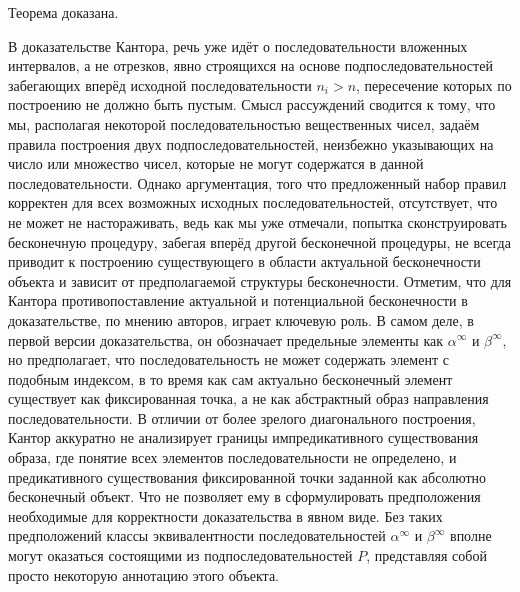 \documentclass[12pt]{article}
\begin{document}
Теорема доказана.

В доказательстве Кантора, речь уже идёт о последовательности вложенных интервалов, а не отрезков, явно строящихся на основе подпоследовательностей забегающих вперёд исходной последовательности $n_i > n$, пересечение которых по построению не должно быть пустым. Смысл рассуждений сводится к тому, что мы, располагая некоторой последовательностью вещественных чисел, задаём правила построения двух подпоследовательностей, неизбежно указывающих на число или множество чисел, которые не могут содержатся в данной последовательности. Однако аргументация, того что предложенный набор правил корректен для всех возможных исходных последовательностей, отсутствует, что не может не настораживать, ведь как мы уже отмечали, попытка сконструировать бесконечную процедуру, забегая вперёд другой бесконечной процедуры, не всегда приводит к построению существующего в области актуальной бесконечности объекта и зависит от предполагаемой структуры бесконечности. Отметим, что для Кантора противопоставление актуальной и потенциальной бесконечности в доказательстве, по мнению авторов, играет ключевую роль. В самом деле, в первой версии доказательства, он обозначает предельные элементы как $\alpha^{\infty}$ и $\beta^{\infty}$, но предполагает, что последовательность не может содержать элемент с подобным индексом, в то время как сам актуально бесконечный элемент существует как фиксированная точка, а не как абстрактный образ направления последовательности. В отличии от более зрелого диагонального построения, Кантор аккуратно не анализирует границы импредикативного существования образа, где понятие всех элементов последовательности не определено, и предикативного существования фиксированной точки заданной как абсолютно бесконечный объект. Что не позволяет ему в сформулировать предположения необходимые для корректности доказательства в явном виде. Без таких предположений классы эквивалентности последовательностей $\alpha^{\infty}$ и $\beta^{\infty}$ вполне могут оказаться состоящими из подпоследовательностей $P$, представляя собой просто некоторую аннотацию этого объекта. 
\end{document}
